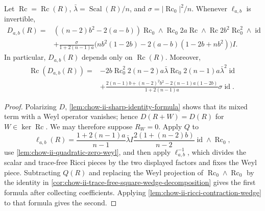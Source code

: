 \begin{theorem}
  \label{thm:chow-ii-conjugation-defect-formula}
  Let \(\operatorname{Rc}=\operatorname{Rc}(R)\),
  \(\bar\lambda=\operatorname{Scal}(R)/n\), and
  \(\sigma=|\operatorname{Rc}_0|^2/n\).  Whenever \(\ell_{a,b}\) is
  invertible,
  \[
  \begin{aligned}
  D_{a,b}(R)={}&((n-2)b^2-2(a-b))\operatorname{Rc}_0\wedge\operatorname{Rc}_0
  2a\operatorname{Rc}\wedge\operatorname{Rc}
  2b^2\operatorname{Rc}_0^2\wedge\operatorname{id}\\
  &+\frac{\sigma}{1+2(n-1)a}
  \bigl(nb^2(1-2b)-2(a-b)(1-2b+nb^2)\bigr)I.
  \end{aligned}
  \]
  In particular, \(D_{a,b}(R)\) depends only on \(\operatorname{Rc}(R)\).
  Moreover,
  \[
  \begin{aligned}
  \operatorname{Rc}(D_{a,b}(R))={}&-2b\operatorname{Rc}_0^2
  2(n-2)a\bar\lambda\operatorname{Rc}_0
  2(n-1)a\bar\lambda^2\operatorname{id}\\
  &+\frac{2(n-1)b+(n-2)^2b^2-2(n-1)a(1-2b)}{1+2(n-1)a}
     \sigma\operatorname{id}.
  \end{aligned}
  \]
\end{theorem}
\begin{proof}
\sketch
  Polarizing \(D\), \ref{lem:chow-ii-sharp-identity-formula} shows that its
  mixed term with a Weyl operator vanishes; hence \(D(R+W)=D(R)\) for
  \(W\in\ker\operatorname{Rc}\).  We may therefore suppose \(R_W=0\).
  Apply \(Q\) to
  \[
  \ell_{a,b}(R)=\frac{1+2(n-1)a}{n-1}\bar\lambda I
    \frac{2(1+(n-2)b)}{n-2}\operatorname{id}\wedge\operatorname{Rc}_0,
  \]
  use \ref{lem:chow-ii-quadratic-zero-weyl}, and then apply
  \(\ell_{a,b}^{-1}\), which divides the scalar and trace-free Ricci pieces by
  the two displayed factors and fixes the Weyl piece.  Subtracting \(Q(R)\)
  and replacing the Weyl projection of
  \(\operatorname{Rc}_0\wedge\operatorname{Rc}_0\) by the identity in
  \ref{cor:chow-ii-trace-free-square-wedge-decomposition} gives the first
  formula after collecting coefficients.  Applying
  \ref{lem:chow-ii-ricci-contraction-wedge} to that formula gives the second.
\end{proof}

